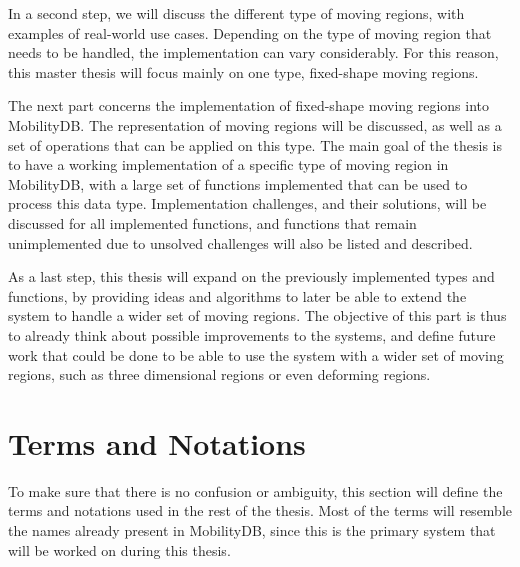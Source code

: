 In a second step, we will discuss the different type of moving regions, with examples of real-world use cases. Depending on the type of moving region that needs to be handled, the implementation can vary considerably. For this reason, this master thesis will focus mainly on one type, fixed-shape moving regions.

The next part concerns the implementation of fixed-shape moving regions into MobilityDB. The representation of moving regions will be discussed, as well as a set of operations that can be applied on this type. The main goal of the thesis is to have a working implementation of a specific type of moving region in MobilityDB, with a large set of functions implemented that can be used to process this data type. Implementation challenges, and their solutions, will be discussed for all implemented functions, and functions that remain unimplemented due to unsolved challenges will also be listed and described.

As a last step, this thesis will expand on the previously implemented types and functions, by providing ideas and algorithms to later be able to extend the system to handle a wider set of moving regions. The objective of this part is thus to already think about possible improvements to the systems, and define future work that could be done to be able to use the system with a wider set of moving regions, such as three dimensional regions or even deforming regions.

\section{Terms and Notations}

To make sure that there is no confusion or ambiguity, this section will define the terms and notations used in the rest of the thesis. Most of the terms will resemble the names already present in MobilityDB, since this is the primary system that will be worked on during this thesis.

